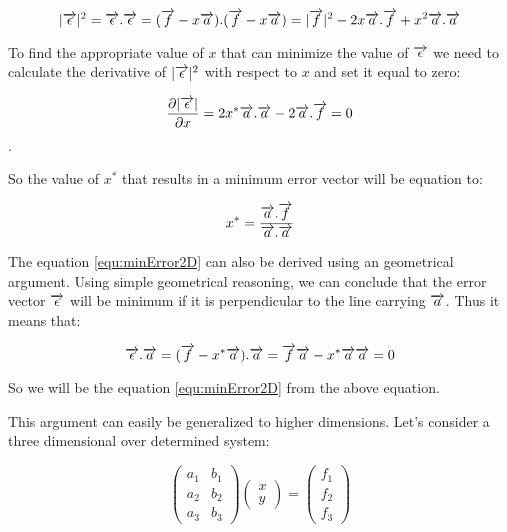 \[ |\overrightarrow{\epsilon}|^2 = \overrightarrow{\epsilon}.\overrightarrow{\epsilon} = (\overrightarrow{f} - x\overrightarrow{a}).(\overrightarrow{f} - x\overrightarrow{a}) = |\overrightarrow{f}|^2 - 2x\overrightarrow{a}.\overrightarrow{f} + x^2\overrightarrow{a}.\overrightarrow{a} \]

To find the appropriate value of $x$ that can minimize the value of $ \overrightarrow{\epsilon} $ we need to calculate the derivative of $ |\overrightarrow{\epsilon}|^2 $ with respect to $x$ and set it equal to zero:
	
\[ \frac{\partial |\overrightarrow{\epsilon}|}{\partial x} = 2x^* \overrightarrow{a} . \overrightarrow{a} - 2\overrightarrow{a}.\overrightarrow{f} = 0 \]. 

So the value of $x^*$ that results in a minimum error vector will be equation to:

\begin{equation}
	x^* = \frac{\overrightarrow{a} . \overrightarrow{f}}{\overrightarrow{a}. \overrightarrow{a}}
	\label{equ:minError2D}
\end{equation}

The equation \ref{equ:minError2D} can also be derived using an geometrical argument. Using simple geometrical reasoning, we can conclude that the error vector $\overrightarrow{\epsilon}$ will be minimum if it is perpendicular to the line carrying $\overrightarrow{a}$. Thus it means that:

\[ \overrightarrow{\epsilon} . \overrightarrow{a} = (\overrightarrow{f} - x^* \overrightarrow{a}) . \overrightarrow{a} = \overrightarrow{f}\overrightarrow{a} - x^* \overrightarrow{a} \overrightarrow{a} = 0 \] 

So we will be the equation \ref{equ:minError2D} from the above equation. 


This argument can easily be generalized to higher dimensions. Let's consider a three dimensional over determined system:



\begin{equation*}
	\begin{pmatrix}
		a_1 & b_1 \\
		a_2 & b_2 \\
		a_3 & b_3
	\end{pmatrix} 
	\begin{pmatrix}
		x \\
		y
	\end{pmatrix}
	= \begin{pmatrix}
		f_1 \\
		f_2 \\
		f_3
	\end{pmatrix}
\end{equation*}






